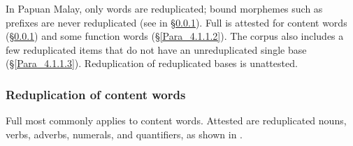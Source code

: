In Papuan Malay, only words are reduplicated; bound morphemes such as prefixes are never reduplicated (see  in §\ref{Para_4.1.1.1}). Full  is attested for content words (§\ref{Para_4.1.1.1}) and some function words (§\ref{Para_4.1.1.2}). The corpus also includes a few reduplicated items that do not have an unreduplicated single base (§\ref{Para_4.1.1.3}). Reduplication of reduplicated bases is unattested.


\subsubsection[Reduplication of content words]{Reduplication of content words}\label{Para_4.1.1.1}
Full  most commonly applies to content words. Attested are reduplicated nouns, verbs, adverbs, numerals, and quantifiers, as shown in .


